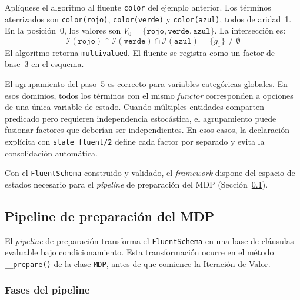 Aplíquese el algoritmo al fluente \texttt{color} del ejemplo anterior. Los términos aterrizados son \texttt{color(rojo)},
\texttt{color(verde)} y \texttt{color(azul)}, todos de aridad~1. En la
posición~0, los valores son $V_0 = \{\texttt{rojo}, \texttt{verde},
\texttt{azul}\}$. La intersección es:
\[
    \mathcal{I}(\texttt{rojo}) \cap \mathcal{I}(\texttt{verde}) \cap
    \mathcal{I}(\texttt{azul}) = \{g_1\} \neq \emptyset
\]
El algoritmo retorna \texttt{multivalued}. El fluente se registra como un factor de
base~3 en el esquema.

El agrupamiento del paso~5 es correcto para variables categóricas globales. En
esos dominios, todos los términos con el mismo \textit{functor} corresponden a
opciones de una única variable de estado. Cuando múltiples entidades comparten
predicado pero requieren independencia estocástica, el agrupamiento puede fusionar
factores que deberían ser independientes. En esos casos, la declaración explícita
con \texttt{state\_fluent/2} define cada factor por separado y evita la
consolidación automática.

Con el \texttt{FluentSchema} construido y validado, el \textit{framework} dispone
del espacio de estados necesario para el \textit{pipeline} de preparación del MDP
(Sección~\ref{sec:di-pipeline-mdp}).


\subsection{Pipeline de preparación del MDP}
\label{sec:di-pipeline-mdp}

El \textit{pipeline} de preparación transforma el \texttt{FluentSchema} en una
base de cláusulas evaluable bajo condicionamiento. Esta transformación ocurre en
el método \texttt{\_\_prepare()} de la clase \texttt{MDP}, antes de que comience
la Iteración de Valor.

\subsubsection{Fases del pipeline}
\label{sec:di-fases-pipeline}

